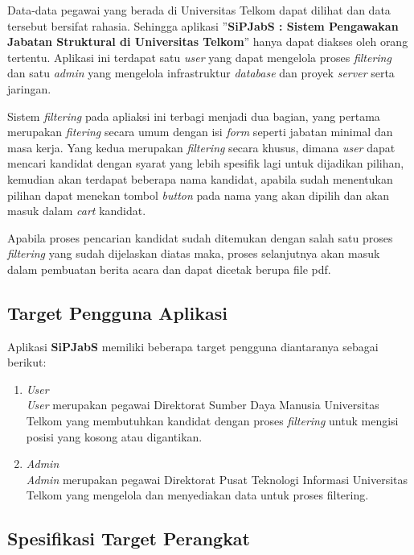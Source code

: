 Data-data pegawai yang berada di Universitas Telkom dapat dilihat dan data tersebut bersifat rahasia. Sehingga aplikasi ”\textbf{SiPJabS : Sistem Pengawakan Jabatan Struktural di Universitas Telkom}” hanya dapat diakses oleh orang tertentu. Aplikasi ini terdapat satu \textit{user} yang dapat mengelola proses \textit{filtering} dan satu \textit{admin} yang mengelola infrastruktur \textit{database} dan proyek \textit{server} serta jaringan.  

Sistem \textit{filtering} pada apliaksi ini terbagi menjadi dua bagian, yang pertama merupakan \textit{fitering} secara umum dengan isi \textit{form} seperti jabatan minimal dan masa kerja. Yang kedua merupakan \textit{filtering} secara khusus, dimana \textit{user} dapat mencari kandidat dengan syarat yang lebih spesifik lagi untuk dijadikan pilihan, kemudian akan terdapat beberapa nama kandidat, apabila sudah menentukan pilihan dapat menekan tombol \textit{button} pada nama yang akan dipilih dan akan masuk dalam \textit{cart} kandidat.

Apabila proses pencarian kandidat sudah ditemukan dengan salah satu proses \textit{filtering} yang sudah dijelaskan diatas maka, proses selanjutnya akan masuk dalam pembuatan berita acara dan dapat dicetak berupa file pdf.  

\subsection{Target Pengguna Aplikasi}

Aplikasi \textbf{SiPJabS} memiliki beberapa target pengguna diantaranya sebagai berikut:

\begin{enumerate}
\item \textit{User} \\
\textit{User} merupakan pegawai Direktorat Sumber Daya Manusia Universitas Telkom yang membutuhkan kandidat dengan proses \textit{filtering} untuk mengisi posisi yang kosong atau digantikan.

\item \textit{Admin} \\
\textit{Admin} merupakan pegawai Direktorat Pusat Teknologi Informasi Universitas Telkom yang mengelola dan menyediakan data untuk proses filtering.
\end{enumerate}

\subsection{Spesifikasi Target Perangkat}

